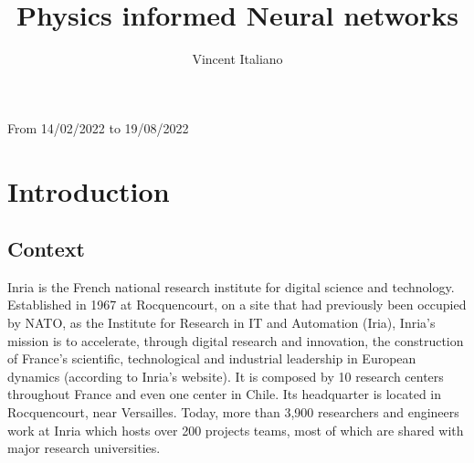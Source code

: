 \documentclass[12pt,openany]{amsbook}
\begin{document}
\begin{titlepage}
	
	
	\vfill\vfill\vfill %
	
	{\large From 14/02/2022 to 19/08/2022} %
	
	
	 
	
	\vfill %
	
\end{titlepage}

\title[PINN's]{Physics informed Neural networks}
\author[V.Italiano]{Vincent Italiano}

\frontmatter
{}
\tableofcontents

\mainmatter
{}
\chapter{Introduction}

\section{Context}

Inria is the French national research institute for digital science and technology. 
Established in 1967 at Rocquencourt, on a site that had previously been occupied by NATO, 
as the Institute for Research in IT and Automation (Iria), Inria’s mission is to accelerate, through digital research and innovation, 
the construction of France’s scientific, technological and industrial leadership in European dynamics 
(according to Inria’s website). It is composed by 10 research centers throughout France and even one center in Chile. 
Its headquarter is located in Rocquencourt, near Versailles. 
Today, more than 3,900 researchers and engineers work at Inria which hosts over 200 projects teams, 
most of which are shared with major research universities.
\end{document}
